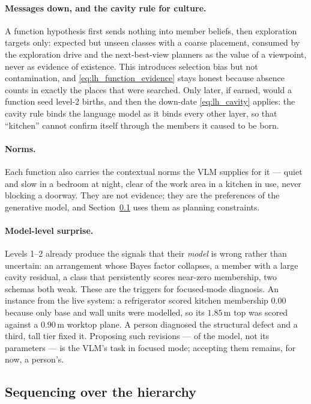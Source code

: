 \paragraph{Messages down, and the cavity rule for culture.}
A function hypothesis first sends nothing into member beliefs, then exploration targets only: expected but unseen
classes with a coarse placement, consumed by the exploration drive and the next-best-view planners as the value of a
viewpoint, never as evidence of existence. This introduces selection bias but not contamination, and
\eqref{eq:lh_function_evidence} stays honest because absence counts in exactly the places that were searched. Only
later, if earned, would a function seed level-2 births, and then the down-date \eqref{eq:lh_cavity} applies: the
cavity rule binds the language model as it binds every other layer, so that ``kitchen'' cannot confirm itself through
the members it caused to be born.

\paragraph{Norms.}
Each function also carries the contextual norms the VLM supplies for it --- quiet and slow in a bedroom at night,
clear of the work area in a kitchen in use, never blocking a doorway. They are not evidence; they are the
preferences of the generative model, and Section~\ref{sec:lang_hierarchy:sequencing} uses them as planning
constraints.

\paragraph{Model-level surprise.}
Levels 1--2 already produce the signals that their \emph{model} is wrong rather than uncertain: an arrangement whose
Bayes factor collapses, a member with a large cavity residual, a class that persistently scores near-zero membership,
two schemas both weak. These are the triggers for focused-mode diagnosis. An instance from the live system: a
refrigerator scored kitchen membership $0.00$ because only base and wall units were modelled, so its $1.85$\,m top
was scored against a $0.90$\,m worktop plane. A person diagnosed the structural defect and a third, tall tier fixed
it. Proposing such revisions --- of the model, not its parameters --- is the VLM's task in focused mode; accepting
them remains, for now, a person's.

\subsection{Sequencing over the hierarchy}
\label{sec:lang_hierarchy:sequencing}

